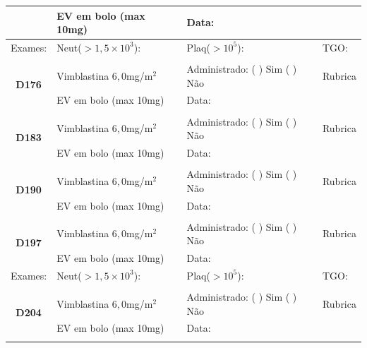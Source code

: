 \documentclass[11pt,a4paper,oldfontcommands]{memoir}
\begin{document}
\begin{center}
\begin{table}[H]
\begin{tabular}{p{}p{}|p{}|p{3cm}}
    \multicolumn{1}{c|}{}&{EV em bolo (max 10mg)}&{Data:}&\\
    \hline
    {Exames:}&{Neut(\(>1,5\times10^3\)):}&{Plaq(\(>10^5\)):}&{TGO:}
    \\
    \hline\\
    \hline
    \multicolumn{1}{c|}{\multirow{2}{*}{\textbf{D176}}}&{Vimblastina \(6,0\)mg/m\(^2\)}&{Administrado: (  ) Sim (  ) Não}&{Rubrica}\\
    \multicolumn{1}{c|}{}&{EV em bolo (max 10mg)}&{Data:}&\\
    \hline
    \\
    \hline
    \multicolumn{1}{c|}{\multirow{2}{*}{\textbf{D183}}}&{Vimblastina \(6,0\)mg/m\(^2\)}&{Administrado: (  ) Sim (  ) Não}&{Rubrica}\\
    \multicolumn{1}{c|}{}&{EV em bolo (max 10mg)}&{Data:}&\\
    \hline
    \\
    \hline
    \multicolumn{1}{c|}{\multirow{2}{*}{\textbf{D190}}}&{Vimblastina \(6,0\)mg/m\(^2\)}&{Administrado: (  ) Sim (  ) Não}&{Rubrica}\\
    \multicolumn{1}{c|}{}&{EV em bolo (max 10mg)}&{Data:}&\\
    \hline
    \\
    \hline
    \multicolumn{1}{c|}{\multirow{2}{*}{\textbf{D197}}}&{Vimblastina \(6,0\)mg/m\(^2\)}&{Administrado: (  ) Sim (  ) Não}&{Rubrica}\\
    \multicolumn{1}{c|}{}&{EV em bolo (max 10mg)}&{Data:}&\\
    \hline
    {Exames:}&{Neut(\(>1,5\times10^3\)):}&{Plaq(\(>10^5\)):}&{TGO:}
    \\
    \hline
    \\
    \hline
    \multicolumn{1}{c|}{\multirow{2}{*}{\textbf{D204}}}&{Vimblastina \(6,0\)mg/m\(^2\)}&{Administrado: (  ) Sim (  ) Não}&{Rubrica}\\
    \multicolumn{1}{c|}{}&{EV em bolo (max 10mg)}&{Data:}&\\
    \hline
    \\
\end{tabular}
\end{table}
\clearpage
\begin{table}[H]
\begin{tabular}{p{}p{}|p{}|p{3cm}}


\end{tabular}
\end{table}
\end{center}
\end{document}

